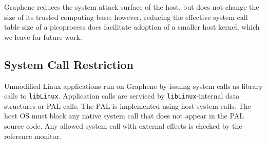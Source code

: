 
Graphene reduces the system attack surface of the host, but does not change the size of its
trusted computing base; however, reducing the effective system call table
size of a picoprocess does facilitate adoption of a smaller host kernel,
which we leave for future work.

\subsection{System Call Restriction}
\label{sec:security:syscalls}


Unmodified Linux applications run on Graphene by issuing 
system calls as library calls to {\tt libLinux}.
Application calls are serviced by {\tt libLinux}-internal data structures
or PAL calls.
The PAL is implemented using \nativecalls{} host system calls.
The host OS must block any 
native system call that 
does not appear in the PAL source code.
Any allowed system call with external effects is checked by 
the reference monitor.








